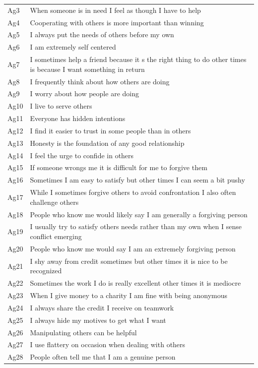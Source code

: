 \documentclass[man]{apa6}
\begin{document}
\begin{longtable}{ll}
Ag3 & When someone is in need  I feel as though I have to help\\
\addlinespace
Ag4 & Cooperating with others is more important than winning\\
Ag5 & I always put the needs of others before my own\\
Ag6 & I am extremely self centered\\
Ag7 & I sometimes help a friend because it s the right thing to do  other times is because I want something in return\\
Ag8 & I frequently think about how others are doing\\
\addlinespace
Ag9 & I worry about how people are doing\\
Ag10 & I live to serve others\\
Ag11 & Everyone has hidden intentions\\
Ag12 & I find it easier to trust in some people than in others\\
Ag13 & Honesty is the foundation of any good relationship\\
\addlinespace
Ag14 & I feel the urge to confide in others\\
Ag15 & If someone wrongs me  it is difficult for me to forgive them\\
Ag16 & Sometimes I am easy to satisfy  but other times I can seem a bit pushy\\
Ag17 & While I sometimes forgive others to avoid confrontation  I also often challenge others\\
Ag18 & People who know me would likely say I am generally a forgiving person\\
\addlinespace
Ag19 & I usually try to satisfy others  needs  rather than my own when I sense conflict emerging\\
Ag20 & People who know me would say I am an extremely forgiving person\\
Ag21 & I shy away from credit sometimes  but other times it is nice to be recognized\\
Ag22 & Sometimes the work I do is really excellent  other times it is mediocre\\
Ag23 & When I give money to a charity  I am fine with being anonymous\\
\addlinespace
Ag24 & I always share the credit I receive on teamwork\\
Ag25 & I always hide my motives to get what I want\\
Ag26 & Manipulating others can be helpful\\
Ag27 & I use flattery on occasion when dealing with others\\
Ag28 & People often tell me that I am a genuine person\\*
\end{longtable}
\end{document}
